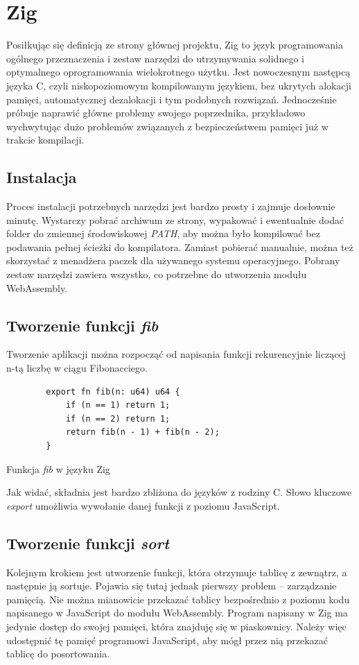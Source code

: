 \documentclass[language=polish,type=master]{aghmodern}
\begin{document}
\section{Zig}
Posiłkując się definicją ze strony głównej projektu\footnotemark{}, Zig to język programowania ogólnego przeznaczenia i zestaw narzędzi do utrzymywania solidnego i optymalnego oprogramowania wielokrotnego użytku.
Jest nowoczesnym następcą języka C, czyli niskopoziomowym kompilowanym językiem, bez ukrytych alokacji pamięci, automatycznej dezalokacji i tym podobnych rozwiązań.
Jednocześnie próbuje naprawić główne problemy swojego poprzednika, przykładowo wychwytując dużo problemów związanych z bezpieczeństwem pamięci już w trakcie kompilacji.

\subsection{Instalacja}
Proces instalacji potrzebnych narzędzi jest bardzo prosty i zajmuje dosłownie minutę.
Wystarczy pobrać archiwum ze strony, wypakować i ewentualnie dodać folder do zmiennej środowiskowej \emph{PATH}, aby można było kompilować bez podawania pełnej ścieżki do kompilatora.
Zamiast pobierać manualnie, można też skorzystać z menadżera paczek dla używanego systemu operacyjnego.
Pobrany zestaw narzędzi zawiera wszystko, co potrzebne do utworzenia modułu WebAssembly.

\subsection{Tworzenie funkcji \emph{fib}}
Tworzenie aplikacji można rozpocząć od napisania funkcji rekurencyjnie liczącej n-tą liczbę w ciągu Fibonacciego.

\begin{listing}[H]
    \begin{verbatim}
        export fn fib(n: u64) u64 {
            if (n == 1) return 1;
            if (n == 2) return 1;
            return fib(n - 1) + fib(n - 2);
        }
    \end{verbatim}
    \caption{Funkcja \emph{fib} w języku Zig}
\end{listing}

Jak widać, składnia jest bardzo zbliżona do języków z rodziny C.
Słowo kluczowe \emph{export} umożliwia wywołanie danej funkcji z poziomu JavaScript.

\subsection{Tworzenie funkcji \emph{sort}}
Kolejnym krokiem jest utworzenie funkcji, która otrzymuje tablicę z zewnątrz, a następnie ją sortuje.
Pojawia się tutaj jednak pierwszy problem -- zarządzanie pamięcią.
Nie można mianowicie przekazać tablicy bezpośrednio z poziomu kodu napisanego w JavaScript do modułu WebAssembly.
Program napisany w Zig ma jedynie dostęp do swojej pamięci, która znajduję się w piaskownicy.
Należy więc udostępnić tę pamięć programowi JavaScript, aby mógł przez nią przekazać tablicę do posortowania.
\end{document}
